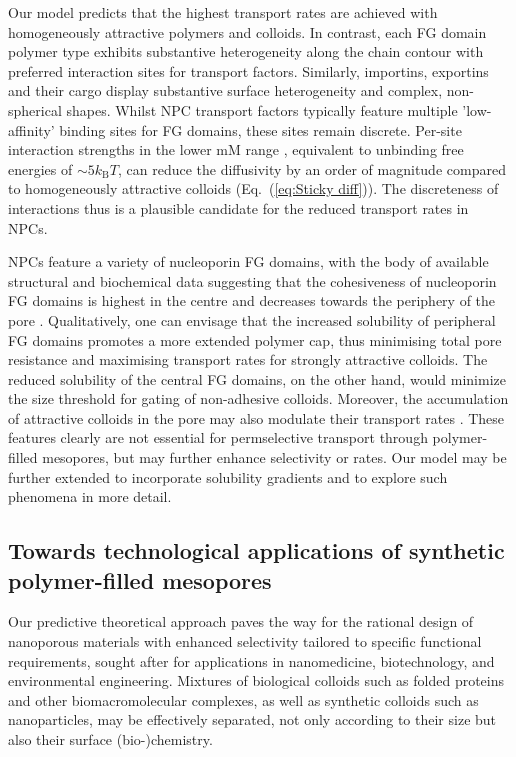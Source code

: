 \documentclass[12pt, a4paper]{article}
\begin{document}
Our model predicts that the highest transport rates are achieved with homogeneously attractive polymers and colloids.
In contrast, each FG domain polymer type exhibits substantive heterogeneity along the chain contour with preferred interaction sites for transport factors.
Similarly, importins, exportins and their cargo display substantive surface heterogeneity and complex, non-spherical shapes.
Whilst NPC transport factors typically feature multiple 'low-affinity' binding sites for FG domains, these sites remain discrete.
Per-site interaction strengths in the lower mM range \cite{Hough2015, Milles2015, Hoogenboom2021}, equivalent to unbinding free energies of $\sim 5 k_\text{B}T$, can reduce the diffusivity by an order of magnitude compared to homogeneously attractive colloids (Eq.~(\ref{eq:Sticky diff})).
The discreteness of interactions thus is a plausible candidate for the reduced transport rates in NPCs. 

NPCs feature a variety of nucleoporin FG domains, with the body of available structural and biochemical data suggesting that the cohesiveness of nucleoporin FG domains is highest in the centre and decreases towards the periphery of the pore \cite{Hoogenboom2021, Ng2023}.
Qualitatively, one can envisage that the increased solubility of peripheral FG domains promotes a more extended polymer cap, thus minimising total pore resistance and maximising transport rates for strongly attractive colloids.
The reduced solubility of the central FG domains, on the other hand, would minimize the size threshold for gating of non-adhesive colloids.
Moreover, the accumulation of attractive colloids in the pore may also modulate their transport rates \cite{Zheng2023}.
These features clearly are not essential for permselective transport through polymer-filled mesopores, but may further enhance selectivity or rates.
Our model may be further extended to incorporate solubility gradients and to explore such phenomena in more detail.

\subsection[Towards technological applications of synthetic polymer-filled mesopores]{Towards technological applications of synthetic \\ polymer-filled mesopores}

Our predictive theoretical approach paves the way for the rational design of nanoporous materials with enhanced selectivity tailored to specific functional requirements, sought after for applications in nanomedicine, biotechnology, and environmental engineering.
Mixtures of biological colloids such as folded proteins and other biomacromolecular complexes, as well as synthetic colloids such as nanoparticles, may be effectively separated, not only according to their size but also their surface (bio-)chemistry.
\end{document}
